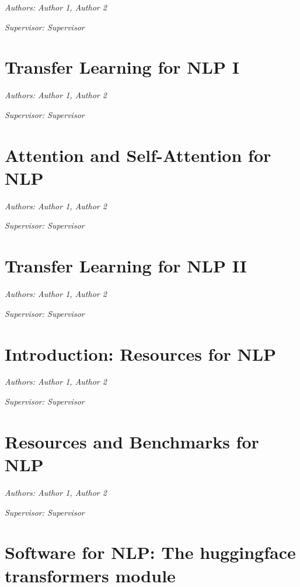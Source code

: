 \documentclass[]{krantz}
\begin{document}
\emph{Authors: Author 1, Author 2}

\emph{Supervisor: Supervisor}

\hypertarget{transfer-learning-for-nlp-i}{%
\chapter{Transfer Learning for NLP I}\label{transfer-learning-for-nlp-i}}

\emph{Authors: Author 1, Author 2}

\emph{Supervisor: Supervisor}

\hypertarget{attention-and-self-attention-for-nlp}{%
\chapter{Attention and Self-Attention for NLP}\label{attention-and-self-attention-for-nlp}}

\emph{Authors: Author 1, Author 2}

\emph{Supervisor: Supervisor}

\hypertarget{transfer-learning-for-nlp-ii}{%
\chapter{Transfer Learning for NLP II}\label{transfer-learning-for-nlp-ii}}

\emph{Authors: Author 1, Author 2}

\emph{Supervisor: Supervisor}

\hypertarget{introduction-resources-for-nlp}{%
\chapter{Introduction: Resources for NLP}\label{introduction-resources-for-nlp}}

\emph{Authors: Author 1, Author 2}

\emph{Supervisor: Supervisor}

\hypertarget{resources-and-benchmarks-for-nlp}{%
\chapter{Resources and Benchmarks for NLP}\label{resources-and-benchmarks-for-nlp}}

\emph{Authors: Author 1, Author 2}

\emph{Supervisor: Supervisor}

\hypertarget{software-for-nlp-the-huggingface-transformers-module}{%
\chapter{Software for NLP: The huggingface transformers module}\label{software-for-nlp-the-huggingface-transformers-module}}
\end{document}
